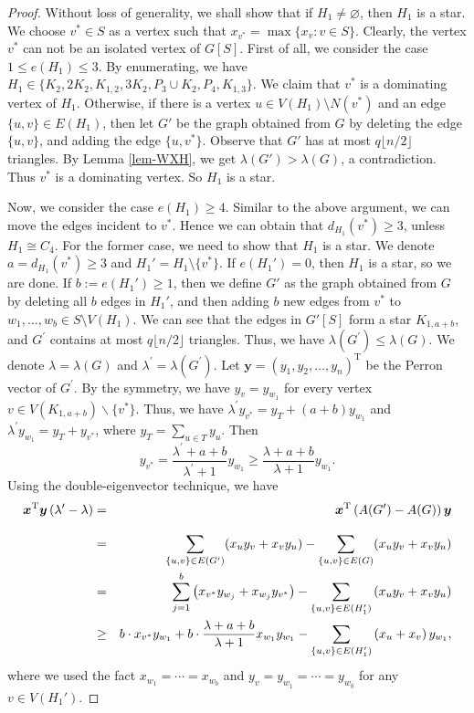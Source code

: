\documentclass[11pt]{article}
\begin{document}
\begin{proof}
Without loss of generality, 
we shall show that if $H_1\neq \varnothing$, 
then $H_1$ is a star. 
We choose $v^* \in S$ as a vertex such that 
${x}_{v^*} = \max\{ {x}_v: v\in S\}$. 
Clearly, the vertex $v^*$ can not be an isolated vertex of $G[S]$.  
First of all, we consider the case $1\le e(H_1)\le 3$. 
By enumerating, we have $H_1\in \{K_2, 2K_2, K_{1,2}, 3K_2, P_3\cup K_2, P_4,K_{1,3}\}$. 
We claim that $v^*$ is a dominating vertex of $H_1$. 
Otherwise, if there is a vertex $u \in V(H_1)\setminus N(v^*)$ and an edge $\{u,v\}\in E(H_1)$, 
then let $G'$ be 
the graph obtained from $G$ by deleting the edge 
$\{u,v\}$, and adding the edge $\{u,v^*\}$. 
Observe that $G'$ has at most $q \lfloor {n}/{2} \rfloor$ 
triangles. By Lemma \ref{lem-WXH}, 
we get $\lambda (G') > \lambda (G)$, a contradiction.  
Thus $v^*$ is a dominating vertex.
So $H_1$ is a star. 

Now, we consider the case $e(H_1)\ge 4$. 
Similar to the above argument,  
we can move the edges incident to $v^*$. 
Hence we can obtain that $d_{H_1}(v^*)\ge 3$, unless $H_1\cong C_4$. 
For the former case, we need to show that $H_1$ is a star.  
We denote $a= d_{H_1}(v^*)\ge 3$ and $H_1'=H_1\setminus  \{v^*\}$. 
If $e(H_1')=0$, then $H_1$ is a star, so we are done. 
If $b:=e(H_1')\ge 1$, then we define $G'$ as the graph 
obtained from $G$ by deleting 
all $b$ edges in $H_1'$, and then adding 
$b$ new edges from $v^*$ to $w_1,\ldots ,w_b 
\in S\setminus V(H_1)$. 
We can see that the edges in $G'[S]$ form a star $K_{1,a+b} $, 
 and $G^{\prime} $ 
contains at most $q \lfloor {n}/{2} \rfloor$ triangles. 
 Thus, we have $\lambda (G^{\prime} ) \leq \lambda (G)$. 
 We denote $\lambda = \lambda (G)$ and 
 $\lambda^{\prime}=\lambda\left(G^{\prime}\right)$. 
 Let $\bm{y}= (y_1, y_2, \ldots, y_n )^{\mathrm{T}}$ be the Perron vector of $G^{\prime}$.
By the symmetry, we have $y_v=y_{w_1}$ for every vertex $v \in V(K_{1,a+b}) \backslash \{v^*\}$. Thus, we have 
$\lambda^{\prime} y_{v^*}= y_T +(a+b) y_{w_1}$ and $\lambda^{\prime} y_{w_1}=y_T +y_{v^*}$, where 
$y_T=\sum_{u\in T} y_u$. Then 
\[  y_{v^*}=\frac{\lambda^{\prime}+a+b}{\lambda^{\prime}+1} y_{w_1} \geq \frac{\lambda+a+b}{\lambda+1} y_{w_1}. \] 
Using the double-eigenvector technique, we have
\begin{eqnarray}
\bm{x}^{\mathrm{T}} \bm{y}\left(\lambda^{\prime}-\lambda\right)  
&=& \bm{x}^{\mathrm{T}} \left( A(G') - A(G) \right)\bm{y} \notag \\[3mm]
&=& \sum_{\{u,v\}\in E(G')} (x_uy_v + x_vy_u) 
-  \sum_{\{u,v\}\in E(G)} (x_uy_v + x_vy_u) \notag \\ 
& = &\sum_{j=1}^b \left(x_{v^*} y_{w_j}+x_{w_j} y_{v^*}\right)-\sum_{\{u, v\} \in E(H_1')}\left(x_u y_v+x_v y_u\right) \notag \\ 
& \geq & b\cdot x_{v^*}y_{w_1} + b \cdot \frac{\lambda+a+b}{\lambda+1} x_{w_1}y_{w_1}-\sum_{\{u,v\} \in E(H_1')}\left(x_u+x_v\right) y_{w_1} , \label{eq3}
\end{eqnarray}
where we used the fact 
$x_{w_1}=\cdots =x_{w_b}$ and $y_v=y_{w_1}=\cdots =y_{w_b}$ for any $v\in V(H_1')$. 



\end{proof}
\end{document}
